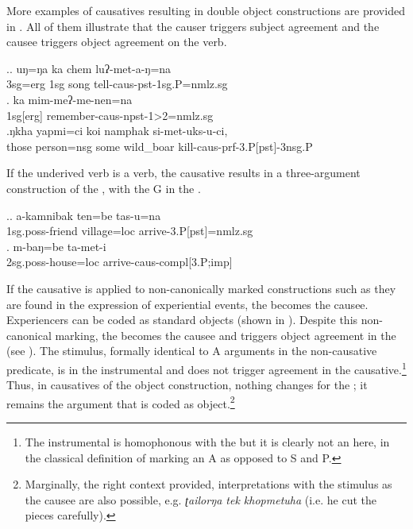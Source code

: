  
 
More examples of causatives resulting in double object constructions are provided in \Next. All of them illustrate  that the causer triggers subject agreement and the causee triggers object agreement on the verb. 

\ex.\ag. uŋ=ŋa ka chem luʔ-met-a-ŋ=na\\
{\sc 3sg=erg} {\sc 1sg} song tell{\sc -caus-pst-1sg.P=nmlz.sg}\\
\bg. ka mim-meʔ-me-nen=na\\
{\sc 1sg[erg]} remember{\sc -caus-npst-1>2=nmlz.sg} \\
\bg.ŋkha yapmi=ci    koi  namphak   si-met-uks-u-ci, \\
those person{\sc =nsg} some wild\_boar kill{\sc -caus-prf-3.P[pst]-3nsg.P}\\

If the underived verb is a  verb, the causative results in a three-argument construction of the , with the G in the  .

\ex.\ag. a-kamnibak ten=be tas-u=na\\
{\sc 1sg.poss-}friend  village{\sc =loc} arrive{\sc -3.P[pst]=nmlz.sg}\\
\bg. m-baŋ=be  ta-met-i\\
{\sc 2sg.poss-}house{\sc =loc} arrive{\sc -caus-compl[3.P;imp]}\\


If the causative is applied to non-canonically marked constructions such as they are found in the expression of experiential events, the   becomes the causee. Experiencers can be coded as standard objects (shown in \Next[a]). Despite this non-canonical marking, the  becomes the causee and triggers object agreement in the  (see \Next[b]). The stimulus, formally identical to A arguments in the non-causative predicate, is in the instrumental  and does not trigger agreement in the causative.\footnote{The instrumental is homophonous with the  but it is clearly not an  here, in the classical definition of marking an A as opposed to S and P.} Thus, in causatives of the object  construction, nothing changes for the ; it remains the argument that is coded as object.\footnote{Marginally, the right context provided, interpretations with the stimulus as the causee are also possible, e.g. \emph{ʈailorŋa tek khopmetuha}  (i.e. he cut the pieces carefully).} 

